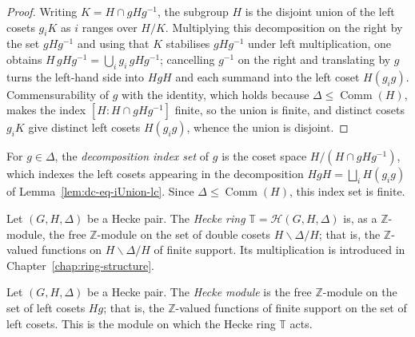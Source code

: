 \begin{proof}
\leanok
Writing $K=H\cap gHg^{-1}$, the subgroup $H$ is the disjoint union of the left cosets
$g_i K$ as $i$ ranges over $H/K$. Multiplying this decomposition on the right by the set
$gHg^{-1}$ and using that $K$ stabilises $gHg^{-1}$ under left multiplication, one obtains
$H\,gHg^{-1}=\bigcup_i g_i\,gHg^{-1}$; cancelling $g^{-1}$ on the right and translating by
$g$ turns the left-hand side into $HgH$ and each summand into the left coset $H(g_i g)$.
Commensurability of $g$ with the identity, which holds because
$\Delta\le\operatorname{Comm}(H)$, makes the index $[H:H\cap gHg^{-1}]$ finite, so the
union is finite, and distinct cosets $g_iK$ give distinct left cosets $H(g_i g)$, whence
the union is disjoint.
\end{proof}

\begin{definition}\label{def:decomp-quot}
\leanok
For $g\in\Delta$, the \emph{decomposition index set} of $g$ is the coset space
$H/(H\cap gHg^{-1})$, which indexes the left cosets appearing in the decomposition
$HgH=\bigsqcup_i H(g_i g)$ of Lemma~\ref{lem:dc-eq-iUnion-lc}. Since
$\Delta\le\operatorname{Comm}(H)$, this index set is finite.
\end{definition}

\begin{definition}\label{def:hecke-ring-carrier}
\leanok
Let $(G,H,\Delta)$ be a Hecke pair. The \emph{Hecke ring}
$\mathbb{T}=\mathcal{H}(G,H,\Delta)$ is, as a $\mathbb{Z}$-module, the free
$\mathbb{Z}$-module on the set of double cosets $H\backslash\Delta/H$; that is, the
$\mathbb{Z}$-valued functions on $H\backslash\Delta/H$ of finite support. Its
multiplication is introduced in Chapter~\ref{chap:ring-structure}.
\end{definition}

\begin{definition}\label{def:hecke-module}
\leanok
Let $(G,H,\Delta)$ be a Hecke pair. The \emph{Hecke module} is the free
$\mathbb{Z}$-module on the set of left cosets $Hg$; that is, the $\mathbb{Z}$-valued
functions of finite support on the set of left cosets. This is the module on which the
Hecke ring $\mathbb{T}$ acts.
\end{definition}
